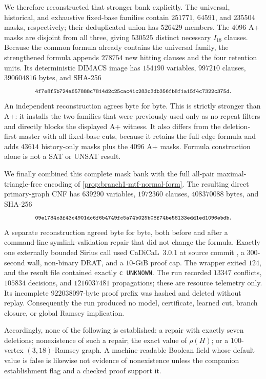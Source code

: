 We therefore reconstructed that stronger bank explicitly.  The universal,
historical, and exhaustive fixed-base families contain \(251771\), \(64591\),
and \(235504\) masks, respectively; their deduplicated union has \(526429\)
members.  The \(4096\) A+ masks are disjoint from all three, giving \(530525\)
distinct necessary \(I_{18}\) clauses.  Because the common formula already
contains the universal family, the strengthened formula appends \(278754\)
new hitting clauses and the four retention units.  Its deterministic DIMACS
image has \(154190\) variables, \(997210\) clauses, \(390604816\) bytes, and
SHA-256
\[
 \sha{4f7e8f5b724a657888c7814d2c25cac41c283c3db356fb8f1a15f4c7322c375d}.
\]
An independent reconstruction agrees byte for byte.  This is strictly
stronger than A+: it installs the two families that were previously used
only as no-repeat filters and directly blocks the displayed A+ witness.  It
also differs from the deletion-first master with all fixed-base cuts, because
it retains the full edge formula and adds \(43614\) history-only masks plus
the \(4096\) A+ masks.  Formula construction alone is not a SAT or UNSAT
result.

We finally combined this complete mask bank with the full all-pair
maximal-triangle-free encoding of \cref{prop:branch1-mtf-normal-form}.  The
resulting direct primary-graph CNF has \(639290\) variables, \(1972360\)
clauses, \(408370088\) bytes, and SHA-256
\[
 \sha{09e1784c3f43c4901dc6f6b4749fc5a74b025b08f74be58133edd1ed1096ebdb}.
\]
A separate reconstruction agreed byte for byte, both before and after a
command-line symlink-validation repair that did not change the formula.
Exactly one externally bounded Sirius call used CaDiCaL~3.0.1 at source
commit , a \(300\)-second wall,
non-binary DRAT, and a \(10\)-GiB proof cap.  The wrapper exited \(124\), and
the result file contained exactly \texttt{c UNKNOWN}.  The run recorded
\(13347\) conflicts, \(105834\) decisions, and \(1216037481\) propagations;
these are resource telemetry only.  Its incomplete \(922038097\)-byte proof
prefix was hashed and deleted without replay.  Consequently the run produced
no model, certificate, learned cut, branch closure, or global Ramsey
implication.

Accordingly, none of the following is established: a repair with exactly
seven deletions; nonexistence of such a repair; the exact value of \(\rho(H)\);
or a \(100\)-vertex \((3,18)\)-Ramsey graph.  A machine-readable Boolean field
whose default value is false is likewise not evidence of nonexistence unless
the companion establishment flag and a checked proof support it.
